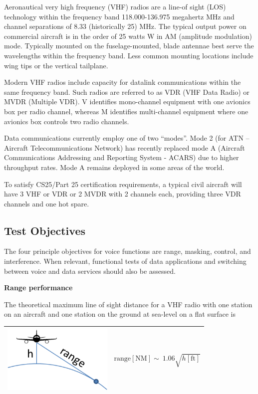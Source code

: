 \documentclass[
]{book}
\begin{document}
Aeronautical very high frequency (VHF) radios are a line-of sight (LOS)
technology within the frequency band 118.000-136.975 megahertz MHz
and channel separations of 8.33 (historically 25) MHz. The
typical output power on commercial aircraft is in the order of 25 watts W
in AM (amplitude modulation) mode. Typically mounted on the fuselage-mounted,
blade antennae best serve the wavelengths within the frequency band. Less common
mounting locations include wing tips or the vertical tailplane.

Modern VHF radios include capacity for datalink communications within the same
frequency band. Such radios are referred to as VDR (VHF Data Radio) or MVDR
(Multiple VDR). V identifies mono-channel equipment with one avionics box per
radio channel, whereas M identifies multi-channel equipment where one avionics
box controls two radio channels.

Data communications currently employ one of two ``modes''. Mode 2 (for ATN --
Aircraft Telecommunications Network) has recently replaced mode A (Aircraft
Communications Addressing and Reporting System - ACARS) due to higher throughput
rates. Mode A remains deployed in some areas of the world.

To satisfy CS25/Part 25 certification requirements, a typical civil aircraft
will have 3 VHF or VDR or 2 MVDR with 2 channels each, providing
three VDR channels and one hot spare.

\hypertarget{test-objectives}{%
\subsection{Test Objectives}\label{test-objectives}}

The four principle objectives for voice functions are range, masking, control,
and interference. When relevant, functional tests of data applications and
switching between voice and data services should also be assessed.

\textbf{Range performance}

The theoretical maximum line of sight distance for a VHF radio with one station
on an aircraft and one station on the ground at sea-level on a flat surface is

\begin{longtable}[]{@{}rl@{}}
\toprule
\endhead
\begin{minipage}[t]{0.47\columnwidth}\raggedleft
\includegraphics[width=2.07847in,height=1.28681in]{media/20/image1.png}\strut
\end{minipage} & \begin{minipage}[t]{0.47\columnwidth}\raggedright
\[\text{range} \left[ \text{NM} \right] \sim\ 1.06\sqrt{h \left[ \text{ft} \right]}\]\strut
\end{minipage}\tabularnewline
\bottomrule
\end{longtable}
\end{document}
